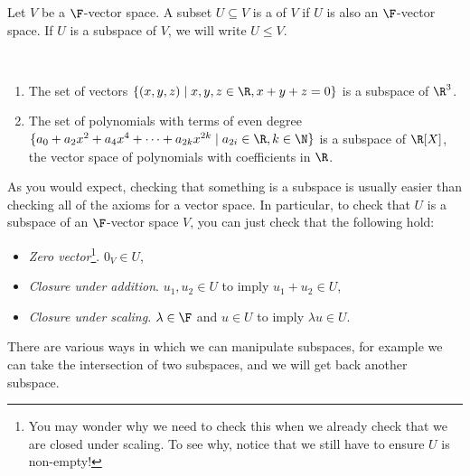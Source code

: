 \begin{definition}[Subspace]
    Let $V$ be a $\F$-vector space.
    A subset $U \subseteq V$ is a  of $V$ if $U$ is also an $\F$-vector space. If $U$ is a subspace of $V$, we will write $U \leq V$.
    
\end{definition}

\begin{example}~
    \vspace{-1.5\baselineskip}
    \begin{enumerate}[label=(\roman*)]
        \item The set of vectors $\{(x, y, z) \mid x, y, z \in \R, x + y + z = 0\}$ is a subspace of $\R^3$.
        \item The set of polynomials with terms of even degree $\{ a_0 + a_2 x^2 + a_4 x^4 + \cdots + a_{2k} x^{2k} \mid a_{2i} \in \R, k \in \N\}$ is a subspace of $\R[X]$, the vector space of polynomials with coefficients in $\R$.
    \end{enumerate}
\end{example}

As you would expect, checking that something is a subspace is usually easier than checking all of the axioms for a vector space. In particular, to check that $U$ is a subspace of an $\F$-vector space $V$, you can just check that the following hold:
\begin{itemize}
    \item \emph{Zero vector}\footnote{You may wonder why we need to check this when we already check that we are closed under scaling. To see why, notice that we still have to ensure $U$ is non-empty!}. $0_V \in U$,
    \item \emph{Closure under addition}. $u_1, u_2 \in U$ to imply $u_1 + u_2 \in U$,
    \item \emph{Closure under scaling}. $\lambda \in \F$ and $u \in U$ to imply $\lambda u \in U$.
\end{itemize}


There are various ways in which we can manipulate subspaces, for example we can take the intersection of two subspaces, and we will get back another subspace. 


